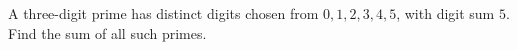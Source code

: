A three-digit prime has distinct digits chosen from $0,1,2,3,4,5$, with digit sum $5$. Find the sum of all such primes.
